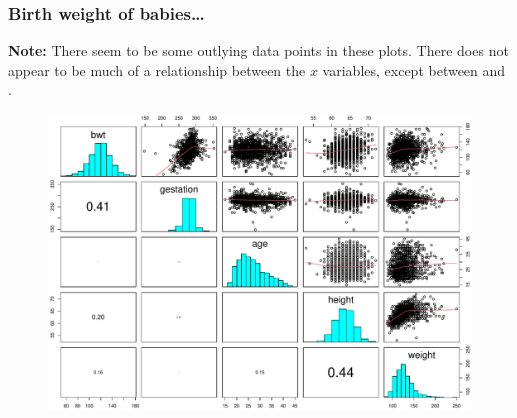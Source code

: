 \documentclass{beamer}\usepackage[]{graphicx}\usepackage[]{xcolor}
\begin{document}
\begin{frame}
\frametitle{Birth weight of babies\ldots}

\textbf{Note:} There seem to be some outlying data points in these plots.
There does not appear to be much of a relationship between the $x$ variables, except between  and .
\medskip

\begin{figure}
  \centering
  \includegraphics[scale = 0.3]{figure/RC-H10-002}
\end{figure}

\end{frame}
\end{document}
